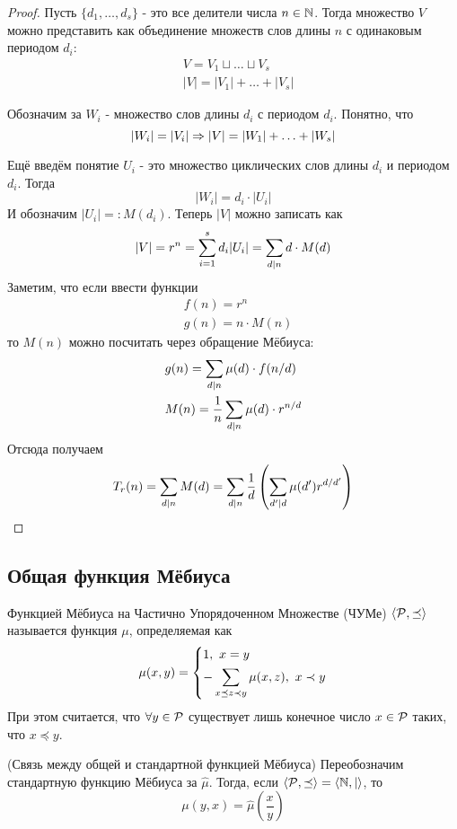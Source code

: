 \begin{proof}
	Пусть $\{d_1, \ldots, d_s\}$ - это все делители числа $n \in \mathbb{N}$. Тогда множество $V$ можно представить как объединение множеств слов длины $n$ с одинаковым периодом $d_i$:
	\begin{align*}
		&V = V_1 \sqcup \ldots \sqcup V_s
		\\
		&|V| = |V_1| + \ldots + |V_s|
	\end{align*}
	
	Обозначим за $W_i$ - множество слов длины $d_i$ с периодом $d_i$. Понятно, что
	\[
		|W_i| = |V_i| \Rightarrow |V| = |W_1| + \ldots + |W_s|
	\]
	
	Ещё введём понятие $U_i$ - это множество циклических слов длины $d_i$ и периодом $d_i$. Тогда
	\[
		|W_i| = d_i \cdot |U_i|
	\]
	И обозначим $|U_i| =: M(d_i)$. Теперь $|V|$ можно записать как
	\[
		|V| = r^n = \sum\limits_{i = 1}^s d_i |U_i| = \sum\limits_{d \mid n} d \cdot M(d)
	\]
	Заметим, что если ввести функции
	\begin{align*}
		&f(n) = r^n
		\\
		&g(n) = n \cdot M(n)
	\end{align*}
	то $M(n)$ можно посчитать через обращение Мёбиуса:
	\begin{align*}
		&g(n) = \sum\limits_{d \mid n} \mu(d) \cdot f(n / d)
		\\
		&M(n) = \frac{1}{n}\sum\limits_{d \mid n} \mu(d) \cdot r^{n / d}
	\end{align*}
	Отсюда получаем
	\[
		T_r(n) = \sum\limits_{d \mid n} M(d) = \sum\limits_{d \mid n} \frac{1}{d} \left(\sum\limits_{d' \mid d} \mu(d') r^{d / d'}\right)
	\]
\end{proof}

\subsection{Общая функция Мёбиуса}

\begin{definition}
	 Функцией Мёбиуса на Частично Упорядоченном Множестве (ЧУМе) $\langle\mathcal{P}, \preceq\rangle$ называется функция $\mu$, определяемая как
	 \[
	 	\mu(x, y) = \left\{\begin{aligned}
	 		&{1,\ x = y}
	 		\\
	 		&{-\sum\limits_{x \preceq z \prec y} \mu(x, z),\ x \prec y}
 		\end{aligned}\right.
	 \]
	 При этом считается, что $\forall y \in \mathcal{P}$ существует лишь конечное число $x \in \mathcal{P}$ таких, что $x \preceq y$.
\end{definition}

\begin{theorem} (Связь между общей и стандартной функцией Мёбиуса)
	Переобозначим стандартную функцию Мёбиуса за $\hat{\mu}$. Тогда, если $\langle\mathcal{P}, \preceq\rangle = \langle\mathbb{N}, |\rangle$, то
	\[
		\mu(y, x) = \hat{\mu}\left(\frac{x}{y}\right)
	\]
\end{theorem}

